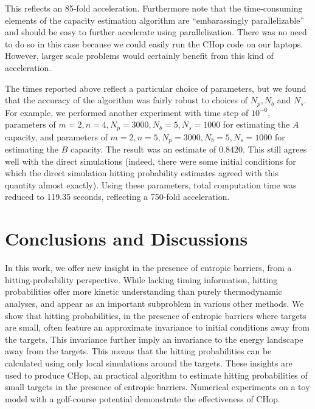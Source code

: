 \documentclass[english, aip, jcp, priprint, graphicx,floatfix]{revtex4-1}
\theoremstyle{plain}
\theoremstyle{definition}
\theoremstyle{plain}
\begin{document}
This reflects an 85-fold acceleration.  Furthermore note that the time-consuming elements of the capacity estimation algorithm are ``embarassingly parallelizable'' and should be easy to further accelerate using parallelization.  There was no need to do so in this case because we could easily run the CHop code on our laptops.  However, larger scale problems would certainly benefit from this kind of acceleration.  

The times reported above reflect a particular choice of parameters, but we found that the accuracy of the algorithm was fairly robust to choices of $N_p, N_b$ and $N_s$.  For example, we performed another experiment with time step of $10^{-6}$, parameters of $ m = 2, n = 4, N_p = 3000, N_b = 5, N_s = 1000 $ for estimating the $A$ capacity, and parameters of $ m = 2, n = 5, N_p = 3000, N_b = 5, N_s = 1000 $ for estimating the $B$ capacity.  The result was an estimate of $0.8420$. This still agrees well with the direct simulations (indeed, there were some initial conditions for which the direct simulation hitting probability estimates agreed with this quantity almost exactly).  Using these parameters, total computation time was reduced to 119.35 seconds, reflecting a 750-fold acceleration.


                                                    

\section{Conclusions and Discussions}\label{sec:discussion}

In this work, we offer new insight in the presence of entropic barriers, from a hitting-probability perspective. While lacking timing information, hitting probabilities offer more kinetic understanding than purely thermodynamic analyses, and appear as an important subproblem in various other methods. We show that hitting probabilities, in the presence of entropic barriers where targets are small, often feature an approximate invariance to initial conditions away from the targets. This invariance further imply an invariance to the energy landscape away from the targets. This means that the hitting probabilities can be calculated using only local simulations around the targets. These insights are used to produce CHop, an practical algorithm to estimate hitting probabilities of small targets in the presence of entropic barriers. Numerical experiments on a toy model with a golf-course potential demonstrate the effectiveness of CHop.
\end{document}
